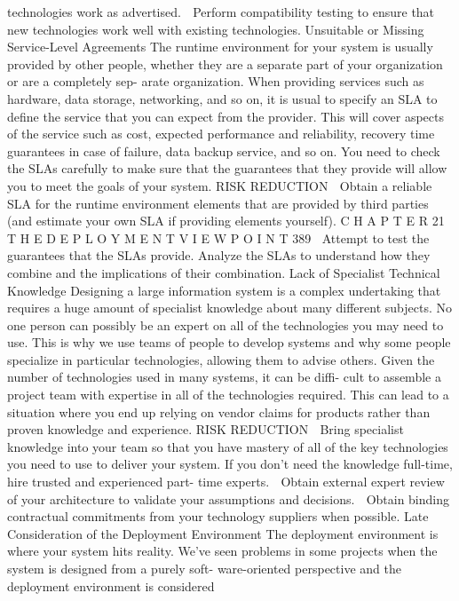 technologies work as advertised.
 Perform compatibility testing to ensure that new technologies work well
with existing technologies.
Unsuitable or Missing Service-Level Agreements
The runtime environment for your system is usually provided by other people,
whether they are a separate part of your organization or are a completely sep-
arate organization. When providing services such as hardware, data storage,
networking, and so on, it is usual to specify an SLA to define the service that
you can expect from the provider. This will cover aspects of the service such
as cost, expected performance and reliability, recovery time guarantees in
case of failure, data backup service, and so on. You need to check the SLAs
carefully to make sure that the guarantees that they provide will allow you to
meet the goals of your system.
RISK REDUCTION
 Obtain a reliable SLA for the runtime environment elements that are
provided by third parties (and estimate your own SLA if providing
elements yourself).
C H A P T E R 21  T H E D E P L O Y M E N T V I E W P O I N T
 389
Attempt to test the guarantees that the SLAs provide.
Analyze the SLAs to understand how they combine and the implications
of their combination.
Lack of Specialist Technical Knowledge
Designing a large information system is a complex undertaking that requires
a huge amount of specialist knowledge about many different subjects. No
one person can possibly be an expert on all of the technologies you may
need to use. This is why we use teams of people to develop systems and why
some people specialize in particular technologies, allowing them to advise
others.
Given the number of technologies used in many systems, it can be diffi-
cult to assemble a project team with expertise in all of the technologies
required. This can lead to a situation where you end up relying on vendor
claims for products rather than proven knowledge and experience.
RISK REDUCTION
 Bring specialist knowledge into your team so that you have mastery of
all of the key technologies you need to use to deliver your system. If you
don’t need the knowledge full-time, hire trusted and experienced part-
time experts.
 Obtain external expert review of your architecture to validate your
assumptions and decisions.
 Obtain binding contractual commitments from your technology suppliers
when possible.
Late Consideration of the Deployment Environment
The deployment environment is where your system hits reality. We’ve seen
problems in some projects when the system is designed from a purely soft-
ware-oriented perspective and the deployment environment is considered
